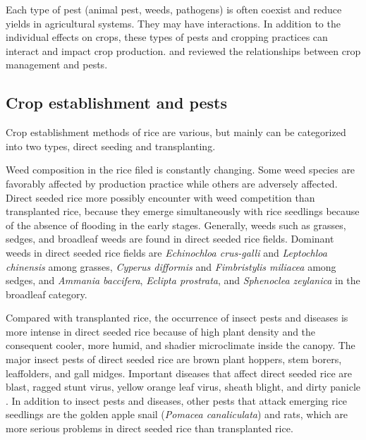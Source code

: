 Each type of pest (animal pest, weeds, pathogens) is often coexist and reduce yields in agricultural systems. They may have interactions. In addition to the individual effects on crops, these types of pests and cropping practices can interact and impact crop production. \cite{ouricedisease, ho1994weed, cohen1998importance} and \cite{Mew:2004kh} reviewed the relationships between crop management and pests. 

\subsection*{Crop establishment and pests}

Crop establishment methods of rice are various, but mainly can be categorized into two types, direct seeding and transplanting. 

Weed composition in the rice filed is constantly changing. Some weed species are favorably affected by production practice while others are adversely affected. Direct seeded rice  more possibly encounter with weed competition than transplanted rice, because they emerge simultaneously with rice seedlings because of the absence of flooding in the early stages. Generally, weeds such as grasses, sedges, and broadleaf weeds are found in direct seeded rice fields. Dominant weeds in direct seeded rice fields are \textit{Echinochloa crus-galli} and \textit{Leptochloa chinensis} among grasses, \textit{Cyperus difformis} and \textit{Fimbristylis miliacea} among sedges, and \textit{Ammania baccifera}, \textit{Eclipta prostrata}, and \textit{Sphenoclea zeylanica} in the broadleaf category.

Compared with transplanted rice, the occurrence of insect pests and diseases is more intense in direct seeded rice because of high plant density and the consequent cooler, more humid, and shadier microclimate inside the canopy. The major insect pests of direct seeded rice are brown plant hoppers, stem borers, leaffolders, and gall midges. Important diseases that affect direct seeded rice are blast, ragged stunt virus, yellow orange leaf virus, sheath blight, and dirty panicle \citep{pongprasert1995insect}. In addition to insect pests and diseases, other pests that attack emerging rice seedlings are the golden apple snail (\textit{Pomacea canaliculata}) and rats, which are more serious problems in direct seeded rice than transplanted rice. 


